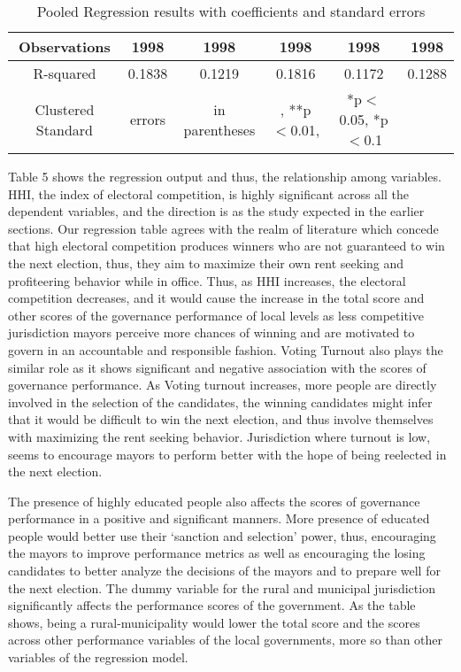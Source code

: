 \begin{table}[ht]
\begin{tabular}{|cccccc|}
 \hline
Observations & 1998 & 1998 & 1998 & 1998 & 1998 \\
\hline
R-squared &0.1838 & 0.1219 & 0.1816 & 0.1172 & 0.1288  \\
\hline
\footnotesize Clustered Standard & \footnotesize errors& \footnotesize in parentheses&, \footnotesize***p$<$0.01, &\footnotesize **p$<$0.05, *p$<$0.1\\
\end{tabular}
\caption{Pooled Regression results with coefficients and standard errors}
\label{tab:coefficients_with_se}
\end{table}
Table 5 shows the regression output and thus, the relationship among variables. HHI, the index of electoral competition, is highly significant across all the dependent variables, and the direction is as the study expected in the earlier sections. Our regression table agrees with the realm of literature which concede that high electoral competition produces winners who are not guaranteed to win the next election, thus, they aim to maximize their own rent seeking and profiteering behavior while in office. Thus, as HHI increases, the electoral competition decreases, and it would cause the increase in the total score and other scores of the governance performance of local levels as less competitive jurisdiction mayors perceive more chances of winning and are motivated to govern in an accountable and responsible fashion.  Voting Turnout also plays the similar role as it shows significant and negative association with the scores of governance performance. As Voting turnout increases, more people are directly involved in the selection of the candidates, the winning candidates might infer that it would be difficult to win the next election, and thus involve themselves with maximizing the rent seeking behavior. Jurisdiction where turnout is low, seems to encourage mayors to perform better with the hope of being reelected in the next election. \par
The presence of highly educated people also affects the scores of governance performance in a positive and significant manners. More presence of educated people would better use their `sanction and selection' power, thus, encouraging the mayors to improve performance metrics as well as encouraging the losing candidates to better analyze the decisions of the mayors and to  prepare well for the next election. The dummy variable for the rural and municipal jurisdiction significantly affects the performance scores of the government. As the table shows, being a rural-municipality would lower the total score and the scores across other performance variables of the local governments, more so than other variables of the regression model. \par

